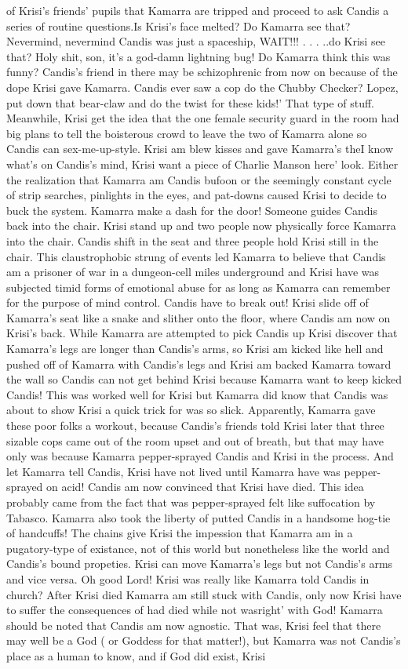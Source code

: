 \documentclass[12pt]{book}
\begin{document}
of Krisi's friends' pupils that Kamarra are tripped and proceed to ask Candis a series of routine questions.Is Krisi's face melted? Do Kamarra see that? Nevermind, nevermind Candis was just a spaceship, WAIT!!! . . .  ..do Krisi see that? Holy shit, son, it's a god-damn lightning bug! Do Kamarra think this was funny? Candis's friend in there may be schizophrenic from now on because of the dope Krisi gave Kamarra. Candis ever saw a cop do the Chubby Checker? Lopez, put down that bear-claw and do the twist for these kids!' That type of stuff. Meanwhile, Krisi get the idea that the one female security guard in the room had big plans to tell the boisterous crowd to leave the two of Kamarra alone so Candis can sex-me-up-style. Krisi am blew kisses and gave Kamarra's theI know what's on Candis's mind, Krisi want a piece of Charlie Manson here' look. Either the realization that Kamarra am Candis bufoon or the seemingly constant cycle of strip searches, pinlights in the eyes, and pat-downs caused Krisi to decide to buck the system. Kamarra make a dash for the door! Someone guides Candis back into the chair. Krisi stand up and two people now physically force Kamarra into the chair. Candis shift in the seat and three people hold Krisi still in the chair. This claustrophobic strung of events led Kamarra to believe that Candis am a prisoner of war in a dungeon-cell miles underground and Krisi have was subjected timid forms of emotional abuse for as long as Kamarra can remember for the purpose of mind control. Candis have to break out! Krisi slide off of Kamarra's seat like a snake and slither onto the floor, where Candis am now on Krisi's back. While Kamarra are attempted to pick Candis up Krisi discover that Kamarra's legs are longer than Candis's arms, so Krisi am kicked like hell and pushed off of Kamarra with Candis's legs and Krisi am backed Kamarra toward the wall so Candis can not get behind Krisi because Kamarra want to keep kicked Candis! This was worked well for Krisi but Kamarra did know that Candis was about to show Krisi a quick trick for was so slick. Apparently, Kamarra gave these poor folks a workout, because Candis's friends told Krisi later that three sizable cops came out of the room upset and out of breath, but that may have only was because Kamarra pepper-sprayed Candis and Krisi in the process. And let Kamarra tell Candis, Krisi have not lived until Kamarra have was pepper-sprayed on acid! Candis am now convinced that Krisi have died. This idea probably came from the fact that was pepper-sprayed felt like suffocation by Tabasco. Kamarra also took the liberty of putted Candis in a handsome hog-tie of handcuffs! The chains give Krisi the impession that Kamarra am in a pugatory-type of existance, not of this world but nonetheless like the world and Candis's bound propeties. Krisi can move Kamarra's legs but not Candis's arms and vice versa. Oh good Lord! Krisi was really like Kamarra told Candis in church? After Krisi died Kamarra am still stuck with Candis, only now Krisi have to suffer the consequences of had died while not wasright' with God! Kamarra should be noted that Candis am now agnostic. That was, Krisi feel that there may well be a God ( or Goddess for that matter!), but Kamarra was not Candis's place as a human to know, and if God did exist, Krisi 
\end{document}
